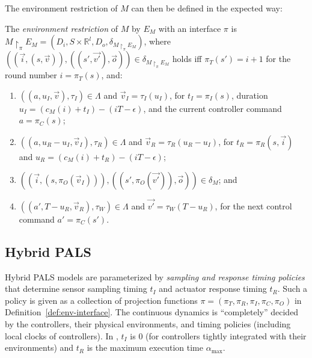 The environment restriction of $M$ can then be defined in the expected way:

\begin{definition}
\label{def:env-res}
The \emph{environment restriction} of $M$ by $E_M$ 
with an interface $\pi$ is %
$M \restriction_\pi E_M = (D_i, S \times \mathbb{R}^l, D_o, \delta_{M \restriction_\pi E_M})$,
where
$( (\vec{i}, (s,\vec{v})), ((s',\vec{v'}), \vec{o}) ) \in \delta_{M \restriction_\pi E_M}$ holds iff
 $\pi_T(s') = i + 1$ for the round number $i = \pi_T(s)$, and:
\begin{enumerate}
    \item %
    $((a,u_I,\vec{v}),\tau_I) \in \Lambda$ and $\vec{v}_I = \tau_I(u_I)$,
    for  $t_I = \pi_I(s)$, duration $u_I = (c_M(i)+t_I)-(iT-\epsilon)$, and
    the current controller command $a = \pi_C(s)$;

    \item %
    $((a,u_R-u_I,\vec{v}_I),\tau_R) \in \Lambda$ and $\vec{v}_R = \tau_R(u_R-u_I)$,
    for $t_R = \pi_R(s,\vec{i})$ and $u_R = (c_M(i)+t_R) - (iT-\epsilon)$;

    \item %
    $( (\vec{i}, (s,\pi_O(\vec{v}_I))), ((s',\pi_O(\vec{v'})), \vec{o}) ) \in \delta_{M}$; and
    
    \item %
    $((a',T - u_R,\vec{v}_R),\tau_W) \in \Lambda$ and  $\vec{v'} = \tau_W(T - u_R)$,
    for the next control command $a' = \pi_C(s')$.
\end{enumerate}
\end{definition}



\subsection{Hybrid PALS}

Hybrid PALS models are parameterized by \emph{sampling and response timing policies}
that 
determine sensor sampling timing $t_I$ and actuator response timing $t_R$.
Such a policy 
is given as a collection of 
projection functions $\pi=(\pi_T, \pi_R, \pi_I, \pi_C, \pi_O)$ 
in Definition~\ref{def:env-interface}.
The continuous dynamics %
is ``completely'' decided  
by the controllers,  %
their physical environments, and timing policies (including local clocks of controllers). 
%
%
In %
\cite{hybrid-pals}, $t_I$ is $0$ 
(for controllers tightly integrated with their environments)
and $t_R$ is  
the maximum execution time $\alpha_{\max}$.


